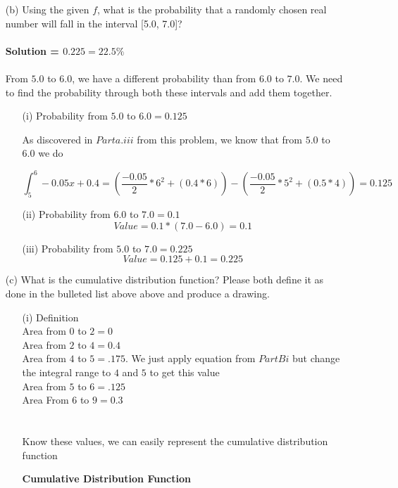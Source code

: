 \documentclass[11pt]{article}
\begin{document}
\begin{enumerate}
\begin{itemize}
\end{itemize}
\item[(b)] Using the given $f$, what is the probability that a randomly chosen real number will fall in the interval [5.0, 7.0]?
\\ \\
\textbf{Solution = $0.225 = 22.5\%$}
\\ \\
From $5.0$ to $6.0$, we have a different probability than from $6.0$ to $7.0$.  We need to find the probability through both these intervals and add them together.  
\begin{itemize}
\item[(i)]  Probability from $5.0$ to $6.0 = 0.125$
\\
\begin{center}
As discovered in $Part a. iii$ from this problem, we know that from $5.0$ to $6.0$ we do 
\end{center}
{\Large $$ \int_5^6 -0.05x + 0.4 = (\frac{-0.05}{2}*6^2 + (0.4*6)) - (\frac{-0.05}{2}*5^2 + (0.5*4)) = 0.125$$ }
\item[(ii)] Probability from $6.0$ to $7.0 = 0.1$
\\
$$Value = 0.1 * (7.0 - 6.0) = 0.1$$
\item[(iii)] Probability from $5.0$ to $7.0 = 0.225$
$$Value = 0.125 + 0.1 = 0.225$$
\end{itemize}
\item[(c)] What is the cumulative distribution function? Please both define it as done in the bulleted list above above and produce a drawing.
\\
\begin{itemize}
\item[(i)] Definition
\\
Area from $0$ to $2 = 0$\\ 
Area from $2$ to $4 = 0.4$\\
Area from $4$ to $5 = .175$.  We just apply equation from $Part B i$ but change the integral range to $4$ and $5$ to get this value\\
Area from $5$ to $6 = .125$\\
Area From $6$ to $9 = 0.3$\\
\\ \\
Know these values, we can easily represent the cumulative distribution function\\
\begin{center}
{\Large \textbf{Cumulative Distribution Function}}\\

\end{center}
\end{itemize}
\end{enumerate}
\end{document}
